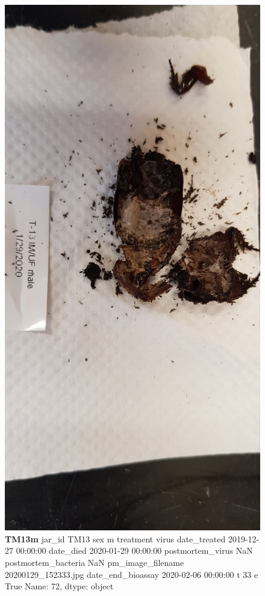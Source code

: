 \begin{figure}[h!]
\centering
\includegraphics[width=\textwidth]{pm-images/20200129_152333.jpg}
\caption{\textbf{TM13m} jar\_id                                TM13
sex                                      m
treatment                            virus
date\_treated           2019-12-27 00:00:00
date\_died              2020-01-29 00:00:00
postmortem\_virus                       NaN
postmortem\_bacteria                    NaN
pm\_image\_filename      20200129\_152333.jpg
date\_end\_bioassay      2020-02-06 00:00:00
t                                       33
e                                     True
Name: 72, dtype: object}
\end{figure}
\clearpage

